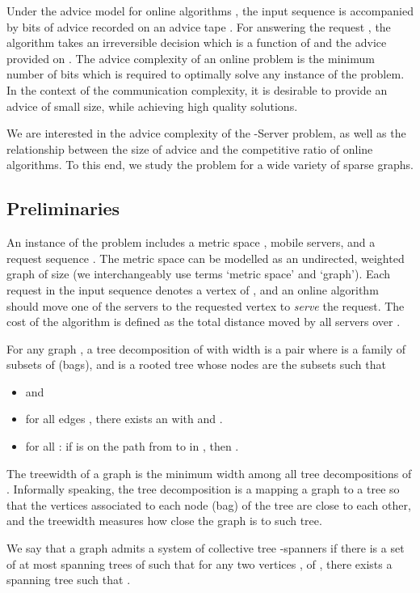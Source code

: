 Under the advice model for online algorithms \cite{Emek2011,Bock11}, the input sequence  is accompanied by  bits of advice recorded on an advice tape . For answering the request , the algorithm takes an irreversible decision which is a function of  and the advice provided on .  The advice complexity of an online problem is the minimum number of bits which is required to optimally solve any instance of the problem.  In the context of the communication complexity, it is desirable to provide an advice of small size, while achieving high quality solutions. 

We are interested in the advice complexity of the -{\sc Server} problem, as well as the relationship between the size of advice and the competitive ratio of online algorithms. 
To this end, we study the problem for a wide variety of sparse graphs. 

\subsection{Preliminaries}
An instance of the \kc problem includes a metric space ,  mobile servers, and a request 
sequence . The metric space can be modelled as an undirected, weighted graph of size  (we interchangeably use terms `metric space' and `graph'). Each request 
in the input sequence  denotes a vertex of , and an online algorithm should move one of the servers to the requested vertex to 
\textit{serve} the request. The cost of the algorithm is defined as the total distance moved by all  servers over . 

For any graph , a tree decomposition of  with width  is a pair  where  is a family of subsets of  (bags), and  is a rooted tree whose nodes are the subsets  such that
\begin{itemize}
	\item  and  
	\item for all edges , there exists an  with  and . 
	\item for all : if  is on the path from  to  in , then .
\end{itemize}

The treewidth of a graph  is the minimum width among all tree decompositions of . 
Informally speaking, the tree decomposition is a mapping a graph to a tree so that the vertices associated to each node (bag) of the tree are close to each other, and the treewidth measures how close the graph is to such tree. 

We say that a graph  admits a system of  collective tree -spanners if there is a set  of at most  spanning trees of  such that for any two vertices ,  of , there exists a spanning tree  such that .

